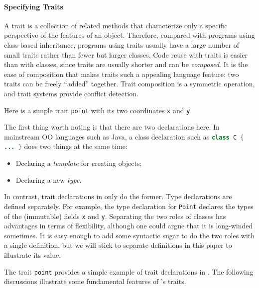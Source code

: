 \paragraph{Specifying Traits}
A trait is a collection of related methods that characterize only
a specific perspective of the features of an object. Therefore, compared with
programs using class-based inheritance, programs using traits usually have a large number of
small traits rather than fewer but larger classes. Code reuse with traits is
easier than with classes, since traits are usually shorter and can be
\textit{composed}. It is the ease of composition that makes traits such a
appealing language feature: two traits can be freely ``added''
together. Trait composition is
a symmetric operation, and trait systems provide conflict detection.

Here is a simple trait \lstinline{point} with its two coordinates \lstinline{x}
and \lstinline{y}.


The first thing worth noting is that there are two declarations here.
In mainstream OO languages such as Java, a class declaration such as
\lstinline[language=java]$class C { ... }$ does two things at the same time:

\begin{itemize}
\item Declaring a \textit{template} for creating objects;
\item Declaring a new \textit{type}.
\end{itemize}

In contrast, trait declarations in \name only do the former. Type declarations
are defined separately. For example, the type declaration for \lstinline{Point}
declares the types of the (immutable) fields \lstinline{x} and \lstinline{y}.
Separating the two roles of classes has advantages in terms of flexibility,
although one could argue that it is long-winded sometimes. It is easy enough to
add some syntactic sugar to do the two roles with a single definition, but we
will stick to separate definitions in this paper to illustrate its value.

The trait \lstinline{point} provides a simple example of trait
declarations in \name. The following discussions illustrate 
some fundamental features of \name's traits.

